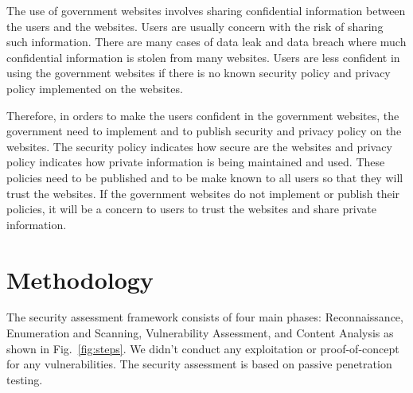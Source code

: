 \documentclass[conference,letterpaper]{IEEEtran}
\begin{document}
The use of government websites involves sharing confidential
information between the users and the websites. Users are usually
concern with the risk of sharing such information. There are many
cases of data leak and data breach where much confidential information
is stolen from many websites. Users are less confident in using the
government websites if there is no known security policy and privacy
policy implemented on the websites\cite{zhao2010opportunities}.

Therefore, in orders to make the users confident in the government
websites, the government need to implement and to publish security and
privacy policy on the websites. The security policy indicates how
secure are the websites and privacy policy indicates how private
information is being maintained and used. These policies need to be
published and to be make known to all users so that they will trust
the websites. If the government websites do not implement or publish
their policies, it will be a concern to users to trust the websites
and share private information\cite{zhao2010opportunities}.







\section{Methodology}

The security assessment framework consists of four main phases:
Reconnaissance, Enumeration and Scanning, Vulnerability Assessment,
and Content Analysis as shown in Fig.~\ref{fig:steps}. We didn't
conduct any exploitation or proof-of-concept for any
vulnerabilities. The security assessment is based on passive
penetration testing\cite{weidman2014penetration}.
\end{document}
